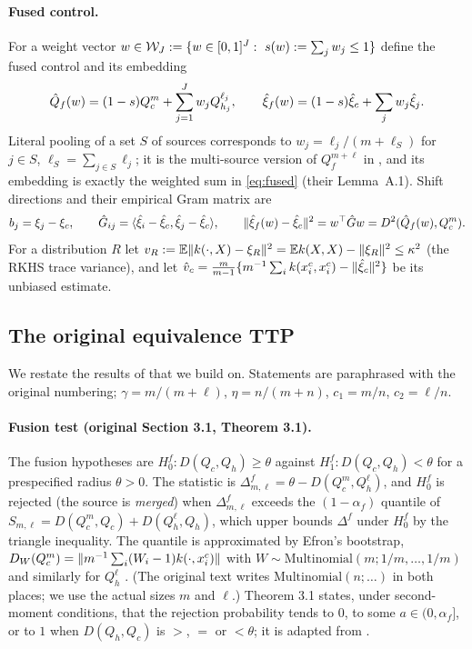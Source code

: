 \documentclass[11pt,a4paper]{article}
\begin{document}
\paragraph{Fused control.} For a weight vector $w\in\mathcal{W}_J:=\{w\in[0,1]^J:\ s(w):=\sum_j w_j\le1\}$ define the fused control and its embedding
\begin{equation}\label{eq:fused}
\hat Q_f(w)=(1-s)Q_c^m+\sum_{j=1}^J w_jQ_{h_j}^{\ell_j},\qquad \hat\xi_f(w)=(1-s)\hat\xi_c+\sum_j w_j\hat\xi_j .
\end{equation}
Literal pooling of a set $S$ of sources corresponds to $w_j=\ell_j/(m+\ell_S)$ for $j\in S$, $\ell_S=\sum_{j\in S}\ell_j$; it is the multi-source version of $Q_f^{m+\ell}$ in \citet{yang2026}, and its embedding is exactly the weighted sum in \eqref{eq:fused} (their Lemma~A.1). Shift directions and their empirical Gram matrix are
\begin{equation}\label{eq:gram}
b_j=\xi_j-\xi_c,\qquad \hat G_{ij}=\langle \hat\xi_i-\hat\xi_c, \hat\xi_j-\hat\xi_c\rangle,\qquad \lVert \hat\xi_f(w)-\hat\xi_c\rVert^2=w^\top\hat Gw = D^2(\hat Q_f(w),Q_c^m).
\end{equation}
For a distribution $R$ let $v_R:=\mathbb{E}\lVert k(\cdot,X)-\xi_R\rVert^2=\mathbb{E} k(X,X)-\lVert \xi_R\rVert^2\le\kappa^2$ (the RKHS trace variance), and let $\hat v_c=\frac{m}{m-1}\{m^{-1}\sum_ik(x^c_i,x^c_i)-\lVert \hat\xi_c\rVert^2\}$ be its unbiased estimate.

\subsection{The original equivalence TTP}\label{sec:orig}

We restate the results of \citet{yang2026} that we build on. Statements are paraphrased with the original numbering; $\gamma=m/(m+\ell)$, $\eta=n/(m+n)$, $c_1=m/n$, $c_2=\ell/n$.

\paragraph{Fusion test (original Section 3.1, Theorem 3.1).} The fusion hypotheses are $H_0^f:D(Q_c,Q_h)\ge\theta$ against $H_1^f:D(Q_c,Q_h)<\theta$ for a prespecified radius $\theta>0$. The statistic is $\Delta^f_{m,\ell}=\theta-D(Q_c^m,Q_h^\ell)$, and $H_0^f$ is rejected (the source is \emph{merged}) when $\Delta^f_{m,\ell}$ exceeds the $(1-\alpha_f)$ quantile of $S_{m,\ell}=D(Q_c^m,Q_c)+D(Q_h^\ell,Q_h)$, which upper bounds $\Delta^f$ under $H_0^f$ by the triangle inequality. The quantile is approximated by Efron's bootstrap, $D_W(Q_c^m)=\lVert m^{-1}\sum_i(W_i-1)k(\cdot,x^c_i)\rVert$ with $W\sim\mathrm{Multinomial}(m;1/m,\dots,1/m)$ and similarly for $Q_h^\ell$ \citep[][Section 4.2, Lemma 7]{liugandy2026}. (The original text writes $\mathrm{Multinomial}(n;\dots)$ in both places; we use the actual sizes $m$ and $\ell$.) Theorem 3.1 states, under second-moment conditions, that the rejection probability tends to $0$, to some $a\in(0,\alpha_f]$, or to $1$ when $D(Q_h,Q_c)$ is $>$, $=$ or $<\theta$; it is adapted from \citet[Theorem 8]{liugandy2026}.
\end{document}
